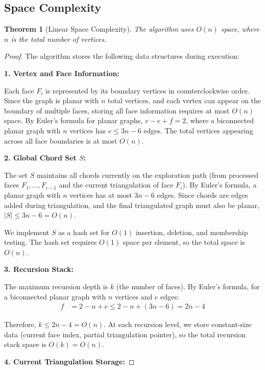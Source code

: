\documentclass[12pt,a4paper]{article}
\newtheorem{theorem}{Theorem}
\theoremstyle{definition}
\theoremstyle{remark}
\begin{document}
\subsection{Space Complexity}

\begin{theorem}[Linear Space Complexity]
\label{thm:space_complexity}
The algorithm uses $O(n)$ space, where $n$ is the total number of vertices.
\end{theorem}

\begin{proof}
The algorithm stores the following data structures during execution:

\textbf{1. Vertex and Face Information:}

Each face $F_i$ is represented by its boundary vertices in counterclockwise order. Since the graph is planar with $n$ total vertices, and each vertex can appear on the boundary of multiple faces, storing all face information requires at most $O(n)$ space. By Euler's formula for planar graphs, $v - e + f = 2$, where a biconnected planar graph with $n$ vertices has $e \leq 3n - 6$ edges. The total vertices appearing across all face boundaries is at most $O(n)$.

\textbf{2. Global Chord Set $S$:}

The set $S$ maintains all chords currently on the exploration path (from processed faces $F_1, \ldots, F_{i-1}$ and the current triangulation of face $F_i$). By Euler's formula, a planar graph with $n$ vertices has at most $3n - 6$ edges. Since chords are edges added during triangulation, and the final triangulated graph must also be planar, $|S| \leq 3n - 6 = O(n)$.

We implement $S$ as a hash set for $O(1)$ insertion, deletion, and membership testing. The hash set requires $O(1)$ space per element, so the total space is $O(n)$.

\textbf{3. Recursion Stack:}

The maximum recursion depth is $k$ (the number of faces). By Euler's formula, for a biconnected planar graph with $n$ vertices and $e$ edges:
\begin{align*}
f &= 2 - n + e \leq 2 - n + (3n - 6) = 2n - 4
\end{align*}

Therefore, $k \leq 2n - 4 = O(n)$. At each recursion level, we store constant-size data (current face index, partial triangulation pointer), so the total recursion stack space is $O(k) = O(n)$.

\textbf{4. Current Triangulation Storage:}


\end{proof}
\end{document}
